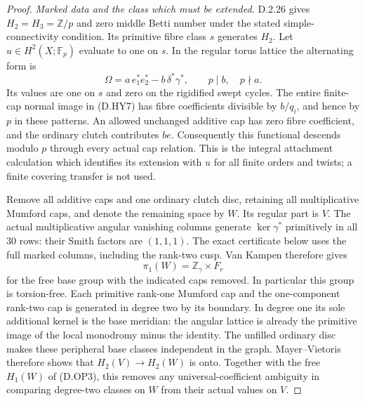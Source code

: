 \begin{proof}
\emph{Marked data and the class which must be extended.}
D.2.26 gives $H_2=H_3=\mathbb Z/p$ and zero middle Betti number
under the stated simple-connectivity condition. Its primitive fibre
class $s$ generates $H_2$. Let $u\in H^2(X;\mathbb F_p)$ evaluate
to one on $s$. In the regular torus lattice the alternating form is
\[
 \Omega=a\,e_1^*e_2^*-b\,\delta^*\gamma^*,\qquad p\mid b,
                                      \quad p\nmid a.
 \tag{D.OP2}
\]
Its values are one on $s$ and zero on the rigidified swept cycles.
The entire finite-cap normal image in (D.HY7) has fibre
coefficients divisible by $b/q_i$, and hence by $p$ in these
patterns. An allowed unchanged additive cap has zero fibre
coefficient, and the ordinary clutch contributes $be$.
Consequently this functional descends modulo $p$ through every
actual cap relation. This is the integral attachment calculation
which identifies its extension with $u$ for all finite orders
and twists; a finite covering transfer is not used.

Remove all additive caps and one ordinary clutch disc, retaining
all multiplicative Mumford caps, and denote the remaining space by
$W$. Its regular part is $V$. The actual multiplicative angular
vanishing columns generate $\ker\gamma^*$ primitively in all
$30$ rows: their Smith factors are $(1,1,1)$. The exact certificate
below uses the full marked columns, including the rank-two cusp.
Van Kampen therefore gives
\[
                  \pi_1(W)=\mathbb Z_\gamma\times F_r
 \tag{D.OP3}
\]
for the free base group with the indicated caps removed. In
particular this group is torsion-free. Each primitive rank-one
Mumford cap and the one-component rank-two cap is generated in
degree two by its boundary. In degree one its sole additional
kernel is the base meridian: the angular lattice is already the
primitive image of the local monodromy minus the identity.
The unfilled ordinary disc makes these peripheral base classes
independent in the graph. Mayer--Vietoris therefore shows that
$H_2(V)\to H_2(W)$ is onto. Together with the free $H_1(W)$ of
(D.OP3), this removes any universal-coefficient ambiguity in
comparing degree-two classes on $W$ from their actual values on $V$.


\end{proof}
